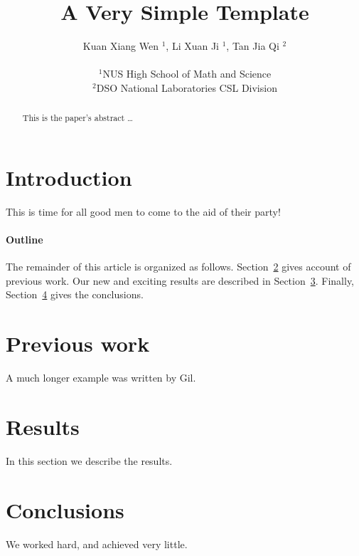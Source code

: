 \documentclass[12pt,a4paper,notitlepage]{article}
\title{A Very Simple Template}
\date{}
\author{
Kuan Xiang Wen $^{1}$, Li Xuan Ji $^{1}$, Tan Jia Qi $^{2}$\\
\vspace{1 mm} \\
\small{$^{1}$NUS High School of Math and Science}\\
\small{$^{2}$DSO National Laboratories CSL Division}
}
\begin{document}
\maketitle
\begin{abstract}
This is the paper's abstract \ldots
\end{abstract}

\section{Introduction}
This is time for all good men to come to the aid of their party!

\paragraph{Outline}
The remainder of this article is organized as follows.
Section~\ref{previous work} gives account of previous work.
Our new and exciting results are described in Section~\ref{results}.
Finally, Section~\ref{conclusions} gives the conclusions.

\section{Previous work}\label{previous work}
A much longer example was written by Gil.

\section{Results}\label{results}
In this section we describe the results.

\section{Conclusions}\label{conclusions}
We worked hard, and achieved very little.

%
%
\end{document}
